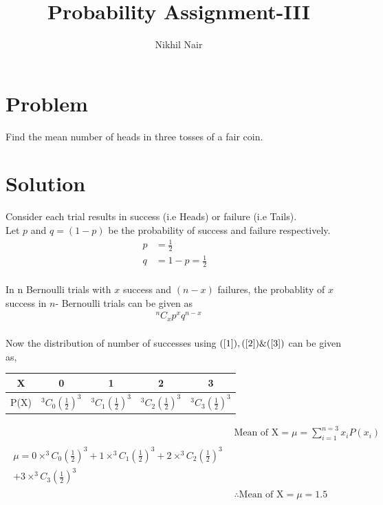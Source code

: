 \documentclass[journal,12pt,twocolumn]{IEEEtran}
\title{\mytitle}
\title{
Probability Assignment-III
}
\author{Nikhil Nair}
\begin{document}
\maketitle
\bigskip


\section{\textbf{Problem }}
Find the mean number of heads in three tosses of a fair coin.


\section{\textbf{Solution }}
Consider each trial results in success (i.e Heads) or failure (i.e Tails).
\\
 
Let $p$ and $q = (1 - p)$ be the probability of success and failure respectively.\\
\begin{align}
p &= \frac{1}{2}&               \label{1}
\\            
q &= 1 - p = \frac{1}{2}&       \label{2}
\end{align}\\
In n Bernoulli trials with $x$ success and $(n - x)$ failures, the probablity of $x$ success in $n$- Bernoulli trials can be given as\\
\begin{align}
^nC_xp^{x} q^{n-x}             \label{3}
\end{align}
\\
Now the distribution of number of successes using $(\ref{1}),(\ref{2}) \& (\ref{3})$ can be given as,
\begin{center}
\begin{tabular}{ |c |c |c |c |c |}
 \hline
 X  &  0 &  1  &  2 & 3\\
 \hline
 P(X)  &  $^3C_0(\frac{1}{2})^{3}$  & $^3C_1(\frac{1}{2})^{3}$  &  $^3C_2(\frac{1}{2})^{3}$ & $^3C_3(\frac{1}{2})^{3}$\\
 \hline
 
\end{tabular}
\end{center}

\begin{align}
&\text{Mean of X} = \mu = \sum_{i=1}^{n=3} x_i P(x_i)&
\\
\begin{split}
\mu = 0 \times ^3C_0(\frac{1}{2})^{3} + 1 \times ^3C_1(\frac{1}{2})^{3} + 2 \times ^3C_2(\frac{1}{2})^{3} \\+ 3 \times ^3C_3(\frac{1}{2})^{3}
\end{split}
\\
&\therefore \text{Mean of X} = \mu = 1.5&
\end{align}
\end{document}
